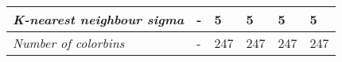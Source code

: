 \begin{table}[]
\begin{tabular}{|l|l|l|l|l|l|}
		\textit{K-nearest neighbour sigma} & -                                                                 & 5                                                                 & 5                                                                 & 5                                                                                        & 5                                                                              \\ \hline
		\textit{Number of colorbins} & -                                                                 & 247                                                                 & 247                                                                 & 247                                                                                        & 247                                                                              \\ \hline
	\end{tabular}
\end{table}
